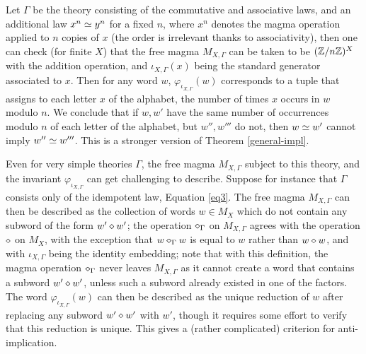 
\begin{example} Let $\Gamma$ be the theory consisting of the commutative and associative laws, and an additional law $x^n \simeq y^n$ for a fixed $n$, where $x^n$ denotes the magma operation applied to $n$ copies of $x$ (the order is irrelevant thanks to associativity), then one can check (for finite $X$) that the free magma $M_{X,\Gamma}$ can be taken to be $(\mathbb{Z}/n\mathbb{Z})^X$ with the addition operation, and $\iota_{X,\Gamma}(x)$ being the standard generator associated to $x$.  Then for any word $w$, $\varphi_{\iota_{X,\Gamma}}(w)$ corresponds to a tuple that assigns to each letter $x$ of the alphabet, the number of times $x$ occurs in $w$ modulo $n$.  We conclude that if $w,w'$ have the same number of occurrences modulo $n$ of each letter of the alphabet, but $w'', w'''$ do not, then $w \simeq w'$ cannot imply $w'' \simeq w'''$.  This is a stronger version of Theorem \ref{general-impl}.
\end{example}

Even for very simple theories $\Gamma$, the free magma $M_{X,\Gamma}$ subject to this theory, and the invariant $\varphi_{\iota_{X,\Gamma}}$ can get challenging to describe. Suppose for instance that $\Gamma$ consists only of the idempotent law, Equation \ref{eq3}.  The free magma $M_{X,\Gamma}$ can then be described as the collection of words $w \in M_X$ which do not contain any subword of the form $w' \diamond w'$; the operation $\diamond_\Gamma$ on $M_{X,\Gamma}$ agrees with the operation $\diamond$ on $M_X$, with the exception that $w \diamond_\Gamma w$ is equal to $w$ rather than $w \diamond w$, and with $\iota_{X,\Gamma}$ being the identity embedding; note that with this definition, the magma operation $\diamond_\Gamma$ never leaves $M_{X,\Gamma}$ as it cannot create a word that contains a subword $w' \diamond w'$, unless such a subword already existed in one of the factors.  The word $\varphi_{\iota_{X,\Gamma}}(w)$ can then be described as the unique reduction of $w$ after replacing any subword $w' \diamond w'$ with $w'$, though it requires some effort to verify that this reduction is unique.  This gives a (rather complicated) criterion for anti-implication.
